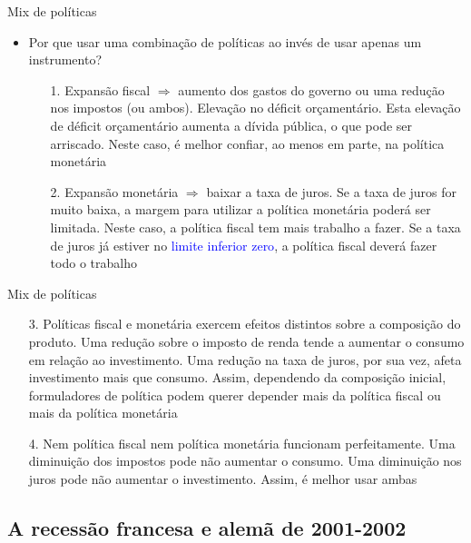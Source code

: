 \documentclass[10pt]{beamer}
\begin{document}
\begin{frame}{Mix de políticas}
\begin{itemize}
    \item Por que usar uma combinação de políticas ao invés de usar apenas um instrumento?
    \bigskip
    \begin{enumerate}
        \item[1.] Expansão fiscal $\Rightarrow$ aumento dos gastos do governo ou uma redução nos impostos (ou ambos). Elevação no déficit orçamentário. Esta elevação de déficit orçamentário aumenta a dívida pública, o que pode ser arriscado. Neste caso, é melhor confiar, ao menos em parte, na política monetária
        \bigskip        
        \item[2.] Expansão monetária $\Rightarrow$ baixar a taxa de juros. Se a taxa de juros for muito baixa, a margem para utilizar a política monetária poderá ser limitada. Neste caso, a política fiscal tem mais trabalho a fazer. Se a taxa de juros já estiver no \textcolor{blue}{limite inferior zero}, a política fiscal deverá fazer todo o trabalho
        
    \end{enumerate}
\end{itemize}
\end{frame}

\begin{frame}{Mix de políticas}
\begin{enumerate}    
    \item[3.] Políticas fiscal e monetária exercem efeitos distintos sobre a composição do produto. Uma redução sobre o  imposto de renda tende a aumentar o consumo em relação ao investimento. Uma redução na taxa de juros, por sua vez, afeta investimento mais que consumo. Assim, dependendo da composição inicial, formuladores de política podem querer depender mais da política fiscal ou mais da política monetária
    \bigskip
    \item[4.] Nem política fiscal nem política monetária funcionam perfeitamente. Uma diminuição dos impostos pode não aumentar o consumo. Uma diminuição nos juros pode não aumentar o investimento. Assim, é melhor usar ambas
\end{enumerate}
\end{frame}

\subsection{A recessão francesa e alemã de 2001-2002}
\end{document}
